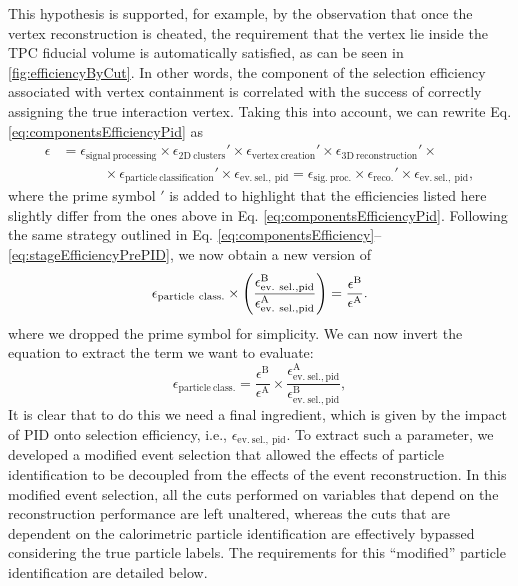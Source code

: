 This hypothesis is supported, for example, by the observation that once the vertex reconstruction is cheated, the requirement that the vertex lie inside the TPC fiducial volume is automatically satisfied, as can be seen in \autoref{fig:efficiencyByCut}. In other words, the component of the selection efficiency associated with vertex containment is correlated with the success of correctly assigning the true interaction vertex. Taking this into account, we can rewrite Eq. \eqref{eq:componentsEfficiencyPid} as \begin{equation}
    \begin{aligned}
        \epsilon &= 
        \epsilon_\mathrm{signal\ processing} \times 
        \epsilon_\mathrm{2D\ clusters}' \times 
        \epsilon_\mathrm{vertex\ creation}' \times 
        \epsilon_\mathrm{3D\ reconstruction}' \times \\
        &\quad\quad\quad\times
        \epsilon_\mathrm{particle\ classification}' \times 
        \epsilon_\mathrm{ev.\ sel.,\ pid}
        = 
        \epsilon_\mathrm{sig.\ proc.} \times 
        \epsilon_\mathrm{reco.}' \times 
        \epsilon_\mathrm{ev.\ sel.,\ pid},
    \end{aligned} \label{eq:componentsEfficiencyPidNew}
\end{equation} where the prime symbol $'$ is added to highlight that the efficiencies listed here slightly differ from the ones above in Eq. \eqref{eq:componentsEfficiencyPid}. Following the same strategy outlined in Eq. \eqref{eq:componentsEfficiency}--\eqref{eq:stageEfficiencyPrePID}, we now obtain a new version of \begin{equation}
    \epsilon_\mathrm{particle\ class.} \times \qty(\frac{
    \epsilon_\mathrm{ev.\ sel., pid}^\mathrm{B}
    }{
    \epsilon_\mathrm{ev.\ sel., pid}^\mathrm{A}
    }) = \frac{
    \epsilon^\mathrm{B}
    }{
    \epsilon^\mathrm{A}
    }. 
\end{equation} where we dropped the prime symbol for simplicity. We can now invert the equation to extract the term we want to evaluate: \begin{equation}
    \epsilon_\mathrm{particle\ class.} = \frac{
    \epsilon^\mathrm{B}
    }{
    \epsilon^\mathrm{A}
    } \times \frac{
    \epsilon_\mathrm{ev.\ sel., pid}^\mathrm{A}
    }{
    \epsilon_\mathrm{ev.\ sel., pid}^\mathrm{B}
    }, \label{eq:stageEfficiencyPostPID}
\end{equation} It is clear that to do this we need a final ingredient, which is given by the impact of PID onto selection efficiency, i.e.,  $\epsilon_\mathrm{ev.\ sel.,\ pid}$. To extract such a parameter, we developed a modified event selection that allowed the effects of particle identification to be decoupled from the effects of the event reconstruction. In this modified event selection, all the cuts performed on variables that depend on the reconstruction performance are left unaltered, whereas the cuts that are dependent on the calorimetric particle identification are effectively bypassed considering the true particle labels. The requirements for this ``modified'' particle identification are detailed below.  

